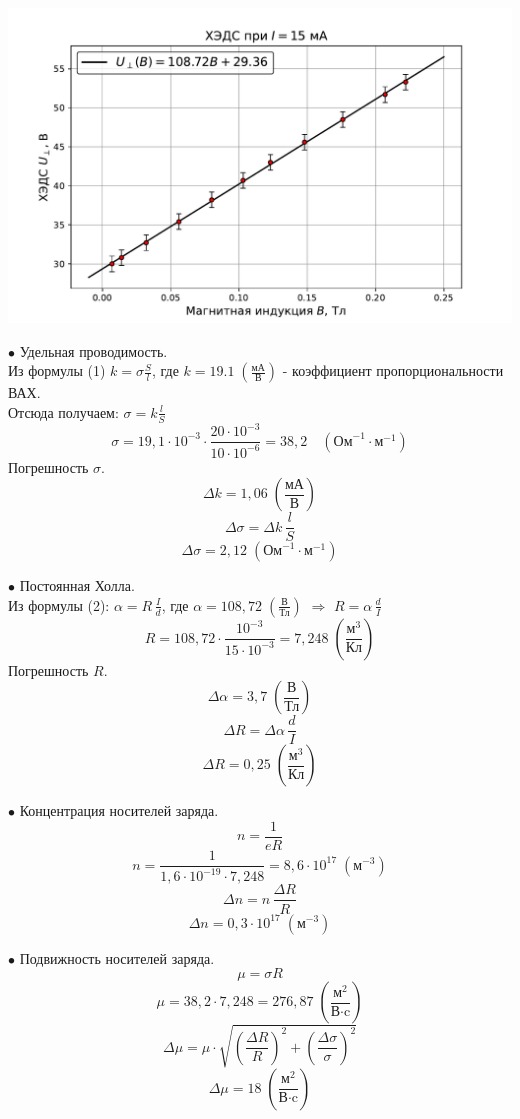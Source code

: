 \documentclass[a4paper]{article}
\begin{document}
\begin{center}
	\includegraphics[scale=0.7]{Hall}
\end{center}

$\bullet$ Удельная проводимость.\\
Из формулы (1) $k=\sigma\frac{S}{l}$, где $k=19.1\;\left( \frac{\mbox{мА}}{\mbox{В}}\right) $ - коэффициент пропорциональности ВАХ.\\
 Отсюда получаем: $\sigma=k\frac{l}{S}$
 $$ \sigma=19,1\cdot10^{-3}\cdot\frac{20\cdot10^{-3}}{10\cdot10^{-6}}=38,2\quad(\mbox{Ом}^{-1}\cdot\mbox{м}^{-1})$$
 Погрешность  $\sigma$.
 $$ \Delta k = 1,06\;\left( \frac{\mbox{мА}}{\mbox{В}}\right) $$
 $$ \Delta\sigma=\Delta k \, \frac{l}{S}$$
  $$ \Delta\sigma=2,12\;(\mbox{Ом}^{-1}\cdot\mbox{м}^{-1})$$

$\bullet$ Постоянная Холла.\\
Из формулы (2): $\alpha=R\,\frac{I}{d}$, где $\alpha = 108,72\;\left( \frac{\mbox{В}}{\mbox{Тл}}\right)$ $\Rightarrow$ $R=\alpha\,\frac{d}{I}$
$$ R=108,72\cdot\frac{10^{-3}}{15\cdot10^{-3}}=7,248\;\left( \frac{\mbox{м}^3}{\mbox{Кл}}\right) $$
Погрешность  $R$.
$$ \Delta\alpha=3,7\;\left( \frac{\mbox{В}}{\mbox{Тл}}\right)$$
$$\Delta R=\Delta \alpha\,\frac{d}{I}$$
$$\Delta R=0,25\;\left( \frac{\mbox{м}^3}{\mbox{Кл}}\right) $$

$\bullet$ Концентрация носителей заряда.\\
$$n=\frac{1}{eR}$$
$$n=\frac{1}{1,6\cdot10^{-19}\cdot7,248}=8,6\cdot10^{17}\;(\mbox{м}^{-3})$$
$$ \Delta n =n\,\frac{\Delta R}{R}$$
$$ \Delta n =0,3\cdot10^{17}\;(\mbox{м}^{-3})$$

$\bullet$ Подвижность носителей заряда.\\
$$ \mu=\sigma R$$
$$ \mu=38,2\cdot7,248=276,87\;\left( \frac{\mbox{м}^2}{\mbox{В}\cdot\mbox{c}}\right) $$
$$ \Delta\mu=\mu\cdot\sqrt{\left( \frac{\Delta R}{R}\right)^2+\left( \frac{\Delta \sigma}{\sigma}\right)^2}$$
$$ \Delta \mu=18\;\left( \frac{\mbox{м}^2}{\mbox{В}\cdot\mbox{c}}\right)$$
\end{document}
